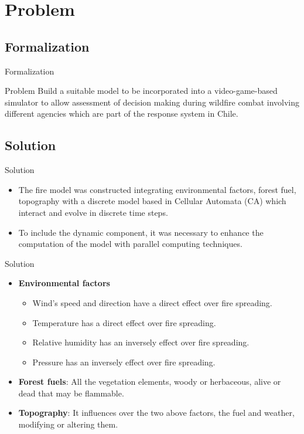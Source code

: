 \documentclass{beamer}
\begin{document}
   
  \section{Problem}    
    \subsection{Formalization}
      
      \begin{frame}{Formalization}
        \begin{block}{Problem}
          Build a suitable model to be incorporated into a video-game-based 
          simulator to allow assessment of decision making during wildfire combat 
          involving different agencies which are part of the response system in Chile.
        \end{block}
      \end{frame}
      
      
    \subsection{Solution}

      \begin{frame}{Solution}
        \begin{itemize}
          \item<1-> The fire model was constructed integrating environmental factors, forest 
            fuel, topography with a discrete model based in Cellular Automata (CA) which interact 
            and evolve in discrete time steps.
          \item<2-> To include the dynamic component, it was necessary to enhance 
            the computation of the model with parallel computing techniques.
        \end{itemize}
      \end{frame}
      
      \begin{frame}{Solution}
        \begin{itemize}
          \item<1-> \textbf{Environmental factors}
            \begin{itemize}
              \item<1-> Wind's speed and direction have a direct effect over fire spreading.
              \item<2-> Temperature has a direct effect over fire spreading.
              \item<3-> Relative humidity has an inversely effect over fire spreading.
              \item<4-> Pressure has an inversely effect over fire spreading.
            \end{itemize}
          \item<5-> \textbf{Forest fuels}: All the vegetation elements, woody or herbaceous, 
            alive or dead that may be flammable.
          \item<6-> \textbf{Topography}: It influences over the two above factors, the fuel and weather,
            modifying or altering them.
        \end{itemize}
      \end{frame}
      
\end{document}
